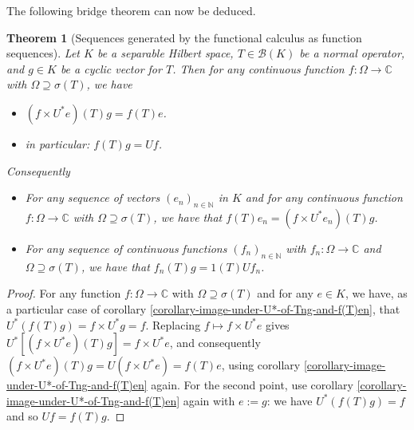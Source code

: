 \documentclass[a4paper,11pt]{article}
\theoremstyle{plain}
\newtheorem{theorem}{Theorem}[section]
\theoremstyle{definition}
\theoremstyle{remark}
\begin{document}
The following bridge theorem can now be deduced.

\begin{theorem}[Sequences generated by the functional calculus as function sequences]
\label{theorem-bridge}
Let $K$ be a separable Hilbert space, $T \in \mathcal{B}(K)$ be a normal operator, and $g \in K$ be a cyclic vector for $T$. Then for any continuous function $f: \Omega \to \mathbb{C}$ with $\Omega \supseteq \sigma(T)$, we have
\begin{itemize}
\item $(f \times U^*e)(T)g = f(T)e$.
\item in particular: $f(T)g = Uf$.
\end{itemize}
Consequently
\begin{itemize}
\item  For any sequence of vectors $(e_n)_{n \in \mathbb{N}}$ in $K$ and for any continuous function $f: \Omega \to \mathbb{C}$ with $\Omega \supseteq \sigma(T)$, we have that $f(T)e_n = (f \times U^*e_n)(T)g$.  
\item For any sequence of continuous functions $(f_n)_{n \in \mathbb{N}}$ with $f_n : \Omega \to \mathbb{C}$ and $\Omega \supseteq \sigma(T)$, we have that $f_n(T)g = 1(T) Uf_n$.
\end{itemize}
\end{theorem}

\begin{proof}
For any function $f : \Omega \to \mathbb{C}$ with $\Omega \supseteq \sigma(T)$ and for any $e \in K$, we have, as a particular case of corollary \ref{corollary-image-under-U*-of-Tng-and-f(T)en}, that $U^*(f(T)g) = f \times U^* g = f$. Replacing $f \mapsto f \times U^* e$ gives $U^* \left[ (f \times U^*e) (T)g  \right]  = f \times U^* e$, and consequently $(f \times U^*e)(T)g = U(f \times U^*e) = f(T)e$, using corollary \ref{corollary-image-under-U*-of-Tng-and-f(T)en} again. For the second point, use corollary  \ref{corollary-image-under-U*-of-Tng-and-f(T)en} again with $e := g$: we have $U^*(f(T)g) = f$ and so $Uf = f(T)g$.
\end{proof}
\end{document}
